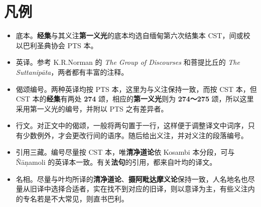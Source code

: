 \chapter{凡例}

\begin{itemize}
    \item 底本。\textbf{经集}与其义注\textbf{第一义光}的底本均选自缅甸第六次结集本 CST，间或校以巴利圣典协会 PTS 本。
    \item 英译。参考 K.R.Norman 的 \textit{The Group of Discourses} 和菩提比丘的 \textit{The Suttanipāta}，两者都有丰富的注释。
    \item 偈颂编号。两种英译均按 PTS 本，这里为与义注保持一致，而按 CST 本，但 CST 本的\textbf{经集}有两处 \textbf{274} 颂，相应的\textbf{第一义光}则为 \textbf{274～275} 颂，所以这里采用第一义光的编号，并附以 PTS 之有差异者。
    \item 行文。对正文中的偈颂，一般将两句置于一行，这样便于调整译文中词序，只有少数例外，才会更改行间的语序。随后给出义注，并对义注的段落编号。
    \item 引用三藏。编号尽量按 CST 本，唯\textbf{清净道论}依 Kosambi 本分段，可与 Ñāṇamoli 的英译本一致。有关\textbf{法句}的引用，都来自叶均的译文。
    \item 名相。尽量与叶均所译的\textbf{清净道论}、\textbf{摄阿毗达摩义论}保持一致，人名地名也尽量从旧译中选择合适者，实在找不到对应的旧译，则以意译为主，有些义注内的专名若是不大常见，则直书巴利。
\end{itemize}